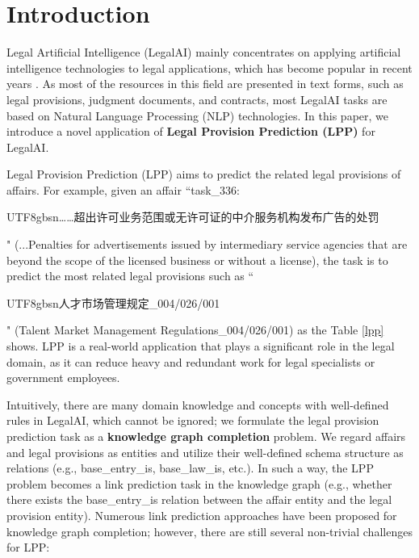 \documentclass[runningheads]{llncs}
\begin{document}
\section{Introduction}

Legal Artificial Intelligence (LegalAI) mainly concentrates on applying artificial intelligence technologies to legal applications, which has become popular in recent years \cite{DBLP:conf/acl/ZhongXTZLS20}. As most of the resources in this field are presented in text forms, such as legal provisions, judgment documents, and contracts, most LegalAI tasks are based on Natural Language Processing (NLP) technologies. In this paper, we introduce a novel application of \textbf{Legal Provision Prediction (LPP)} for LegalAI.  

Legal Provision Prediction (LPP) aims to predict the related legal provisions of affairs. For example,  given an affair  ``task\_336: \begin{CJK}{UTF8}{gbsn}……超出许可业务范围或无许可证的中介服务机构发布广告的处罚\end{CJK}" (...Penalties for advertisements issued by intermediary service agencies that are beyond the scope of the licensed business or without a license), the task is to predict the most related legal provisions such as `` \begin{CJK}{UTF8}{gbsn}人才市场管理规定\_004/026/001 \end{CJK} " (Talent Market Management Regulations\_004/026/001) as the Table \ref{lpp} shows. LPP is a real-world application that plays a significant role in the legal domain, as it can reduce heavy and redundant work for legal specialists or government employees.  

Intuitively, there are many domain knowledge and concepts with well-defined rules in LegalAI, which cannot be ignored; we formulate the legal provision prediction task as a \textbf{knowledge graph completion} problem.  We regard affairs and legal provisions as entities and utilize their well-defined schema structure as relations (e.g., base\_entry\_is, base\_law\_is, etc.). In such a way, the LPP problem becomes a link prediction task in the knowledge graph (e.g., whether there exists the base\_entry\_is relation between the affair entity and the legal provision entity). Numerous link prediction approaches \cite{TransE:conf/nips/BordesUGWY13,DistMult:conf/iclr/2015,kazemi2018simple} have been proposed for knowledge graph completion; however, there are still several non-trivial challenges for LPP:
\end{document}
